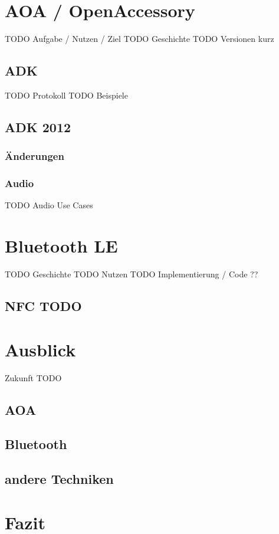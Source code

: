 \documentclass[12pt,journal,compsoc]{IEEEtran}
\begin{document}
\section{AOA / OpenAccessory}

TODO Aufgabe / Nutzen / Ziel
TODO Geschichte
TODO Versionen kurz

\subsection{ADK}

TODO Protokoll
TODO Beispiele
\subsection{ADK 2012}
\subsubsection{Änderungen}

\subsubsection{Audio}
TODO Audio Use Cases

\section{Bluetooth LE}
TODO Geschichte
TODO Nutzen
TODO Implementierung / Code ??


\subsection{NFC TODO}



\section{Ausblick}
Zukunft TODO
\subsection{AOA}

\subsection{Bluetooth}
\subsection{andere Techniken}

\section{Fazit}








\end{document}
